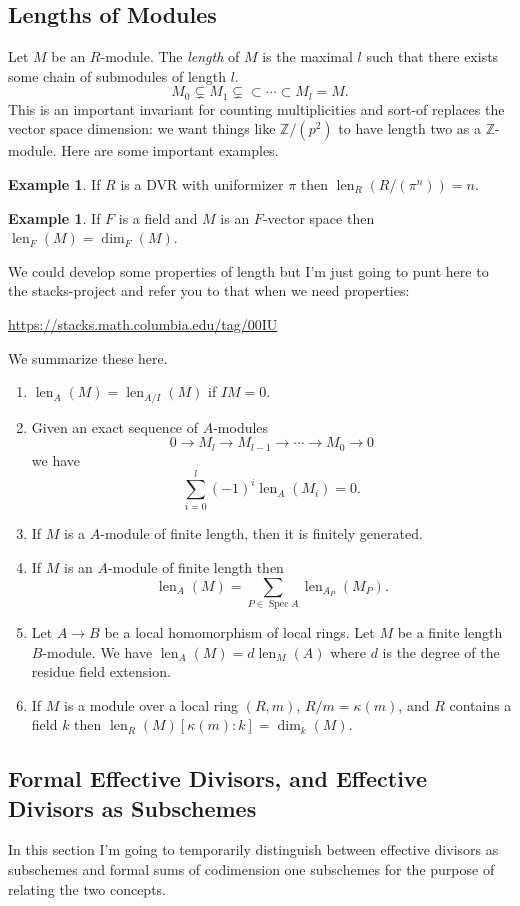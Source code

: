 \documentclass[12pt]{article}
\numberwithin{equation}{section}
\theoremstyle{definition}
\newtheorem{example}[theorem]{Example}
\theoremstyle{remark}
\newcommand{\ZZ}{\mathbb{Z}}
\newcommand{\Spec}{\operatorname{Spec}}
\newcommand{\len}{\operatorname{len}}
\begin{document}
\subsection{Lengths of Modules}
Let $M$ be an $R$-module. 
The \emph{length} of $M$ is the maximal $l$ such that there exists some chain of submodules of length $l$. 
 $$ M_0 \subsetneq M_1 \subsetneq \subset \cdots \subset M_l = M. $$
This is an important invariant for counting multiplicities and sort-of replaces the vector space dimension: we want things like $\ZZ/(p^2)$ to have length two as a $\ZZ$-module. 
Here are some important examples.
\begin{example}
	If $R$ is a DVR with uniformizer $\pi$ then $\len_R(R/(\pi^n)) = n$.
\end{example}
\begin{example}
	If $F$ is a field and $M$ is an $F$-vector space then $\len_F(M)=\dim_F(M)$.
\end{example}

We could develop some properties of length but I'm just going to punt here to the stacks-project and refer you to that when we need properties:
\begin{center}
	\url{https://stacks.math.columbia.edu/tag/00IU}
\end{center}
We summarize these here.
\begin{enumerate}
	\item $\len_A(M) = \len_{A/I}(M)$ if $IM=0$. 
	\item Given an exact sequence of $A$-modules 
	 $$ 0 \to M_l \to M_{l-1} \to \cdots \to M_0 \to 0 $$
	 we have 
	  $$\sum_{i=0}^l (-1)^i \len_A(M_i) =0. $$
	\item If $M$ is a $A$-module of finite length, then it is finitely generated.
	\item If $M$ is an $A$-module of finite length then
	 $$ \len_A(M) = \sum_{P \in \Spec A} \len_{A_P}(M_P).$$
	\item Let $A \to B$ be a local homomorphism of local rings. 
	Let $M$ be a finite length $B$-module. 
	We have $\len_A(M) = d\len_M(A)$ where $d$ is the degree of the residue field extension. 
	\item If $M$ is a module over a local ring $(R,m)$, $R/m=\kappa(m)$, and $R$ contains a field $k$ then $\len_R(M) [\kappa(m):k] = \dim_k(M)$. 
\end{enumerate}


\subsection{Formal Effective Divisors, and Effective Divisors as Subschemes}
In this section I'm going to temporarily distinguish between effective divisors as subschemes and formal sums of codimension one subschemes for the purpose of relating the two concepts. 
\end{document}
